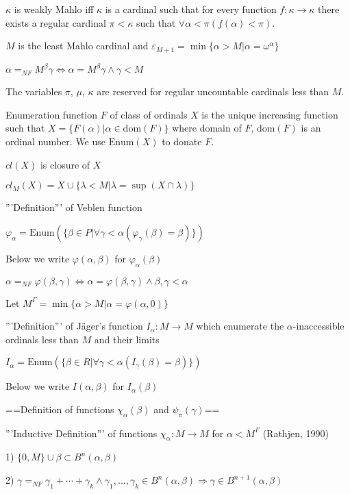 \documentclass[10pt]{article}
\begin{document}
\(\kappa\) is weakly Mahlo iff \(\kappa\) is a cardinal such that for every function \(f: \kappa\rightarrow\kappa\) there
exists a regular cardinal \(\pi < \kappa\) such that \(\forall\alpha<\pi(f(\alpha)< \pi)\).

\(M\) is  the least Mahlo cardinal and \(\varepsilon_{M+1}=\min\{\alpha>M|\alpha=\omega^\alpha\}\) 

\(\alpha=_{NF}M^\beta\gamma\Leftrightarrow\alpha=M^\beta\gamma\wedge\gamma<M\)

The variables \(\pi\), \(\mu\), \(\kappa\) are reserved for regular uncountable cardinals less than \(M\).

Enumeration function \(F\) of class of ordinals \(X\) is the unique increasing function such that \(X=\{F(\alpha)|\alpha\in\text{dom}(F)\}\) where domain of \(F\), \(\text{dom}(F)\) is an ordinal number. We use \(\text{Enum}(X)\) to donate \(F\).

\(cl(X) \) is closure of \(X\) 

\(cl_M(X)=X\cup\{\lambda<M|\lambda=\sup(X\cap\lambda)\} \)

'''Definition''' of Veblen function

\(\varphi_\alpha=\text{Enum}(\{\beta\in P|\forall\gamma<\alpha(\varphi_\gamma(\beta)=\beta)\})\)

Below we write \(\varphi(\alpha,\beta)\) for \(\varphi_\alpha(\beta)\)

\(\alpha=_{NF}\varphi(\beta,\gamma)\Leftrightarrow\alpha=\varphi(\beta,\gamma)\wedge\beta,\gamma<\alpha\)

Let \(M^{\Gamma}=\min\{\alpha>M|\alpha=\varphi(\alpha,0)\}\)

'''Definition''' of Jäger's function \(I_\alpha:M\rightarrow M\) which enumerate the \(\alpha\)-inaccessible ordinals less than \(M\) and their limits

\(I_\alpha=\text{Enum}(\{\beta\in R|\forall\gamma<\alpha(I_\gamma(\beta)=\beta)\}) \)

Below we write \(I(\alpha,\beta)\) for \(I_\alpha(\beta)\)


==Definition of functions \(\chi_\alpha(\beta) \) and \(\psi_\pi(\gamma) \)==

'''Inductive Definition''' of  functions \(\chi_\alpha: M\rightarrow M\) for \(\alpha <M^{\Gamma}\) (Rathjen, 1990)

1) \(\{0,M\}\cup\beta\subset B^n(\alpha, \beta)\)

2) \(\gamma=_{NF}\gamma_1+\cdots+\gamma_k\wedge\gamma_1,...,\gamma_k\in B^n(\alpha, \beta)\Rightarrow\gamma\in B^{n+1}(\alpha, \beta)\)
\end{document}
